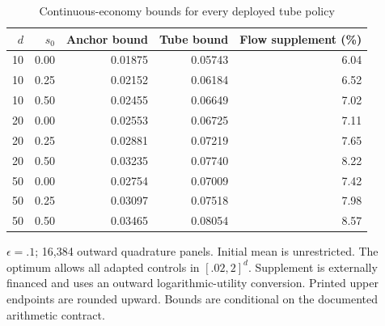 \begin{table}[htbp]
\centering\small
\caption{Continuous-economy bounds for every deployed tube policy}\label{tab:r10bounds}
\begin{tabular}{rrrrr}
\toprule
$d$ & $s_0$ & Anchor bound & Tube bound & Flow supplement (\%)\\
\midrule
10 & 0.00 & 0.01875 & 0.05743 & 6.04\\
10 & 0.25 & 0.02152 & 0.06184 & 6.52\\
10 & 0.50 & 0.02455 & 0.06649 & 7.02\\
20 & 0.00 & 0.02553 & 0.06725 & 7.11\\
20 & 0.25 & 0.02881 & 0.07219 & 7.65\\
20 & 0.50 & 0.03235 & 0.07740 & 8.22\\
50 & 0.00 & 0.02754 & 0.07009 & 7.42\\
50 & 0.25 & 0.03097 & 0.07518 & 7.98\\
50 & 0.50 & 0.03465 & 0.08054 & 8.57\\
\bottomrule
\end{tabular}
\par\smallskip\begin{minipage}{.97\linewidth}\footnotesize $\epsilon=.1$; 16,384 outward quadrature panels. Initial mean is unrestricted. The optimum allows all adapted controls in $[.02,2]^d$. Supplement is externally financed and uses an outward logarithmic-utility conversion. Printed upper endpoints are rounded upward. Bounds are conditional on the documented arithmetic contract.\end{minipage}
\end{table}
